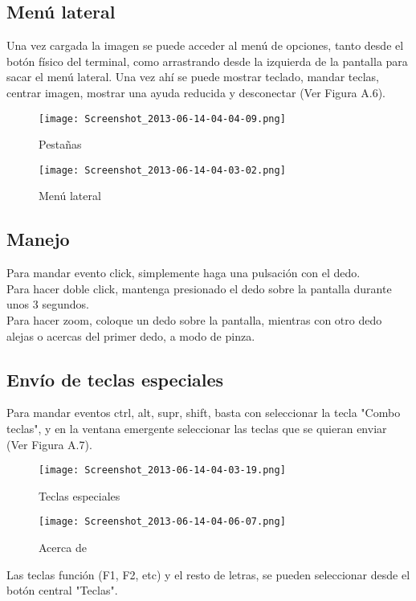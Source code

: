 \subsection{Menú lateral}
Una vez cargada la imagen se puede acceder al menú de opciones, tanto desde el botón físico del terminal, como arrastrando desde la izquierda de la pantalla para sacar el menú lateral. Una vez ahí se puede mostrar teclado, mandar teclas, centrar imagen, mostrar una ayuda reducida  y desconectar (Ver Figura A.6).
\begin{figure}[h]
\hfill
\begin{minipage}[t]{.45\textwidth}
\begin{center}
\texttt{[image: Screenshot\_2013-06-14-04-04-09.png]}
\caption{Pestañas}
\end{center}
\end{minipage}
\hfill
\begin{minipage}[t]{.45\textwidth}
\begin{center}
\texttt{[image: Screenshot\_2013-06-14-04-03-02.png]}
\caption{Menú lateral}
\end{center}
\end{minipage}
\hfill
\end{figure}
\subsection{Manejo}
Para mandar evento click, simplemente haga una pulsación con el dedo.\\

Para hacer doble click, mantenga presionado el dedo sobre la pantalla durante unos 3 segundos.\\

Para hacer zoom, coloque un dedo sobre la pantalla, mientras con otro dedo alejas o acercas del primer dedo, a modo de pinza.
\subsection{Envío de teclas especiales}
Para mandar eventos ctrl, alt, supr, shift, basta con seleccionar la tecla "Combo teclas", y en la ventana emergente seleccionar las teclas que se quieran enviar (Ver Figura A.7).
\begin{figure}[h]
\hfill
\begin{minipage}[t]{.45\textwidth}
\begin{center}
\texttt{[image: Screenshot\_2013-06-14-04-03-19.png]}
\caption{Teclas especiales}
\end{center}
\end{minipage}
\hfill
\begin{minipage}[t]{.45\textwidth}
\begin{center}
\texttt{[image: Screenshot\_2013-06-14-04-06-07.png]}
\caption{Acerca de}
\end{center}
\end{minipage}
\hfill
\end{figure}

Las teclas función (F1, F2, etc) y el resto de letras, se pueden seleccionar desde el botón central "Teclas".
